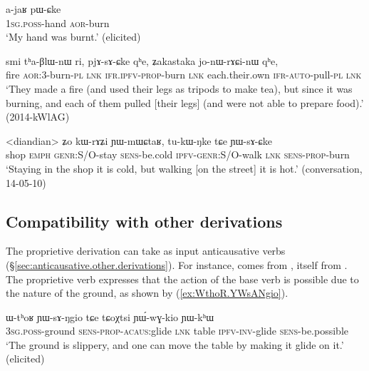 \begin{exe}
\ex \label{ex:pWCke}
\gll a-jaʁ pɯ-ɕke \\
\textsc{1sg}.\textsc{poss}-hand \textsc{aor}-burn \\
\glt `My hand was burnt.' (elicited)
\end{exe}

\begin{exe}
\ex \label{ex:pjAsACke}
\gll smi tʰa-βlɯ-nɯ ri, pjɤ-sɤ-ɕke qʰe, ʑakastaka jo-nɯ-rɤɕi-nɯ qʰe, \\
fire \textsc{aor}:3\flobv{}-burn-\textsc{pl} \textsc{lnk} \textsc{ifr}.\textsc{ipfv}-\textsc{prop}-burn \textsc{lnk} each.their.own \textsc{ifr}-\textsc{auto}-pull-\textsc{pl} \textsc{lnk} \\
\glt `They made a fire (and used their legs as tripods to make tea), but since it was burning, and each of them pulled [their legs] (and were not able to prepare food).' (2014-kWlAG)
\end{exe}

\begin{exe}
\ex \label{ex:tukWNke.YWsACKe}
\gll <diandian> ʑo kɯ-rɤʑi ɲɯ-mɯɕtaʁ, tu-kɯ-ŋke tɕe ɲɯ-sɤ-ɕke \\
shop \textsc{emph} \textsc{genr}:S/O-stay \textsc{sens}-be.cold \textsc{ipfv}-\textsc{genr}:S/O-walk \textsc{lnk} \textsc{sens}-\textsc{prop}-burn \\
\glt `Staying in the shop it is cold, but walking [on the street] it is hot.' (conversation, 14-05-10)
\end{exe}

\subsection{Compatibility with other derivations} \label{sec:proprietive.compatibility}
The proprietive derivation can take as input anticausative verbs (§\ref{sec:anticausative.other.derivations}). For instance,   comes from  , itself from . The proprietive verb  expresses that the action of the base verb  is possible due to the nature of the ground, as shown by (\ref{ex:WthoR.YWsANgio}).


\begin{exe}
\ex \label{ex:WthoR.YWsANgio}
\gll ɯ-tʰoʁ ɲɯ-sɤ-ŋgio tɕe tɕoχtsi ɲɯ́-wɣ-kio ɲɯ-kʰɯ \\
\textsc{3sg}.\textsc{poss}-ground \textsc{sens}-\textsc{prop}-\textsc{acaus}:glide \textsc{lnk} table \textsc{ipfv}-\textsc{inv}-glide \textsc{sens}-be.possible \\
\glt `The ground is slippery, and one can move the table by making it glide on it.' (elicited)
\end{exe}
 
